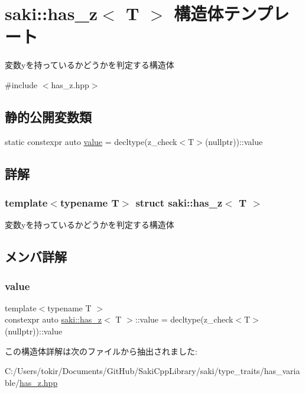 \hypertarget{structsaki_1_1has__z}{}\section{saki\+:\+:has\+\_\+z$<$ T $>$ 構造体テンプレート}
\label{structsaki_1_1has__z}


変数yを持っているかどうかを判定する構造体  




{\ttfamily \#include $<$has\+\_\+z.\+hpp$>$}

\subsection*{静的公開変数類}
\begin{DoxyCompactItemize}
\item 
static constexpr auto \mbox{\hyperlink{structsaki_1_1has__z_a4abee363bc8a82bb0030300abba45ceb}{value}} = decltype(z\+\_\+check$<$T$>$(nullptr))\+::value
\end{DoxyCompactItemize}


\subsection{詳解}
\subsubsection*{template$<$typename T$>$\newline
struct saki\+::has\+\_\+z$<$ T $>$}

変数yを持っているかどうかを判定する構造体 

\subsection{メンバ詳解}
\mbox{\label{structsaki_1_1has__z_a4abee363bc8a82bb0030300abba45ceb}} 
\subsubsection{\texorpdfstring{value}{value}}
{\footnotesize\ttfamily template$<$typename T $>$ \\
constexpr auto \mbox{\hyperlink{structsaki_1_1has__z}{saki\+::has\+\_\+z}}$<$ T $>$\+::value = decltype(z\+\_\+check$<$T$>$(nullptr))\+::value\hspace{0.3cm}{\ttfamily [static]}}



この構造体詳解は次のファイルから抽出されました\+:\begin{DoxyCompactItemize}
\item 
C\+:/\+Users/tokir/\+Documents/\+Git\+Hub/\+Saki\+Cpp\+Library/saki/type\+\_\+traits/has\+\_\+variable/\mbox{\hyperlink{has__z_8hpp}{has\+\_\+z.\+hpp}}\end{DoxyCompactItemize}

